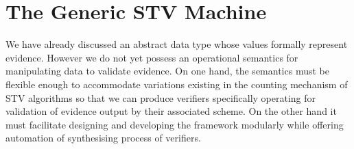 \documentclass[10pt,conference]{IEEEtran}
\begin{document}
\section{The Generic STV  Machine}
\label{sec:Machine}
\setlength{\abovedisplayskip}{0.5em}
\setlength{\belowdisplayskip}{0.5em}
We have already discussed an abstract data type whose values  formally represent evidence. However we do not yet possess an operational semantics for manipulating data to validate evidence.   On one hand, the semantics must be flexible enough to accommodate variations existing in the counting mechanism of STV algorithms so that we can produce verifiers  specifically operating for validation of evidence output by their associated scheme. On the other hand it must facilitate designing and developing the framework modularly while offering automation of synthesising process of verifiers.



\end{document}
